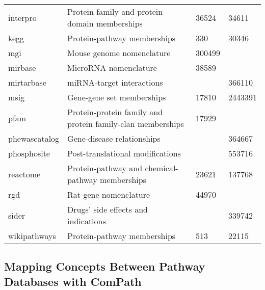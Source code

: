 \begin{table}[h!]
\begin{tabular}{llll}
    interpro       & Protein-family and protein-domain memberships              & 36524  & 34611     \\
    kegg           & Protein-pathway memberships                                & 330    & 30346     \\
    mgi            & Mouse genome nomenclature                                  & 300499 &           \\
    mirbase        & MicroRNA nomenclature                                      & 38589  &           \\
    mirtarbase     & miRNA-target interactions                                  &        & 366110    \\
    msig           & Gene-gene set memberships                                  & 17810  & 2443391   \\
    pfam           & Protein-protein family and protein family-clan memberships & 17929  &           \\
    phewascatalog  & Gene-disease relationships                                 &        & 364667    \\
    phosphosite    & Post-translational modifications                           &        & 553716    \\
    reactome       & Protein-pathway and chemical-pathway memberships           & 23621  & 137768    \\
    rgd            & Rat gene nomenclature                                      & 44970  &           \\
    sider          & Drugs' side effects and indications                        &        & 339742    \\
    wikipathways   & Protein-pathway memberships                                & 513    & 22115     \\
\end{tabular}
\end{table}

\subsection*{Mapping Concepts Between Pathway Databases with ComPath}

